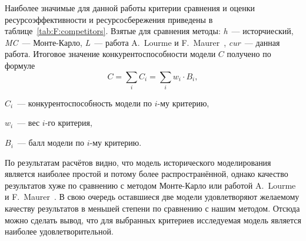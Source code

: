 Наиболее значимые для данной работы критерии сравнения и оценки ресурсоэффективности и ресурсосбережения приведены в таблице~\ref{tab:F:competitors}.
Взятые для сравнения методы: \textit{h}~--- исторчиеский, \textit{MC}~--- Монте-Карло, \textit{L}~--- работа A.~Lourme и F.~Maurer~\cite{Lourme2016}, \textit{cur}~--- данная работа.
Итоговое значение конкурентоспособности модели $C$ получено по формуле
\begin{equation} C = \sum_i C_i = \sum_i w_i \cdot B_i, \end{equation}
\begin{where}
    \item $C_i$~--- конкурентоспособность модели по $i$-му критерию, 
    \item $w_i$~--- вес $i$-го критерия, 
    \item $B_i$~--- балл модели по $i$-му критерию.
\end{where}

По результатам расчётов видно, что модель исторического моделирования является наиболее простой и потому более распространённой, однако качество результатов хуже по сравнению с методом Монте-Карло или работой A.~Lourme и F.~Maurer~\cite{Lourme2016}. 
В свою очередь оставшиеся две модели удовлетворяют желаемому качеству результатов в меньшей степени по сравнению с нашим методом.
Отсюда можно сделать вывод, что для выбранных критериев исследуемая модель является наиболее удовлетворительной.





